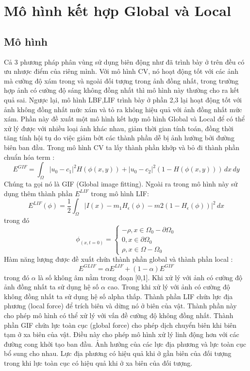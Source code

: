\documentclass[14pt,oneside,a4paper]{extreport}
\begin{document}
\section{Mô hình kết hợp Global và Local}
\subsection{Mô hình}
Cả 3 phương pháp phân vùng sử dụng biên động như đã trình bày ở trên đều có ưu nhược điểm của riêng mình. Với mô hình CV, nó hoạt động tốt với các ảnh mà cường độ xám trong và ngoài đối tượng trong ảnh đồng nhất, trong trường hợp  ảnh có cường độ sáng không đồng nhất thì mô hình này thường cho ra kết quả sai. Ngược lại, mô hình LBF,LIF trình bày ở phần 2,3 lại hoạt động tốt với ảnh không đồng nhất mức xám và tỏ ra không hiệu quả với ảnh đồng nhất mức xám. Phần này  đề xuất một mô hình kết hợp mô hình Global và Local để có thể xử lý được với nhiều loại ảnh khác nhau, giảm thời gian tính toán, đồng thời tăng tính hội tụ do việc giảm bớt các thành phần dễ bị ảnh hường bởi đường biên ban đầu. Trong mô hình CV ta lấy thành phần khớp và bỏ đi thành phần chuẩn hóa term :
\begin{equation*}
E^{GIF}=\int_{\Omega} |u_0-c_1|^2H(\phi(x,y))+ |u_0-c_2|^2(1-H(\phi(x,y))) \,dx\,dy
\end{equation*} 
Chúng ta gọi nó là GIF (Global image fitting). Ngoài ra trong mô hình này sử dụng thêm thành phần $E^{LIF}$ trong mô hình LIF:
\begin{equation*}
E^{LIF}(\phi)=\dfrac{1}{2}\int_{\Omega}|I(x)-m_1H_{\epsilon}(\phi)-m2(1-H_{\epsilon}(\phi))|^2\,dx
\end{equation*}
trong đó 
\begin{equation*}
\phi_(x,t=0)=\begin{cases}
-\rho, x\in \Omega_0 -\partial \Omega_0\\
0, x\in \partial \Omega_0\\
\rho, x\in \Omega- \Omega_0
\end{cases}
\end{equation*}
Hàm năng lượng được đề xuất chứa thành phần global và thành phần local :
\begin{equation}
E^{GLIF}=\alpha E^{LIF}+(1-\alpha)E^{GIF}
\end{equation}
trong đó $\alpha$ là số không âm nằm trong đoạn [0,1]. Khi xử lý với ảnh có cường độ ảnh đồng nhất ta sử dụng hệ số $\alpha$ cao. Trong khi xử lý với ảnh có cường độ không đồng nhất ta sử dụng hệ số alpha thấp. Thành phần LIF chứa lực địa phương (local force) để trích biên và dừng nó ở biên của vật. Thành phần này cho phép mô hình có thể xử lý với vấn đề cường độ không đồng nhất. Thành phần GIF chứa lực toàn cục (global force) cho phép dịch chuyển biên khi biên tạm ở xa biên của vật. Điều này cho phép mô hình xử lý linh động hơn với các đường cong khởi tạo ban đầu.
Ảnh hưởng của các lực địa phương và lực toàn cục bổ sung cho nhau. Lực địa phương có hiệu quả khi ở gần biên của đối tượng trong khi lực toàn cục có hiệu quả khi ở xa biên của đối tượng. 
\end{document}
